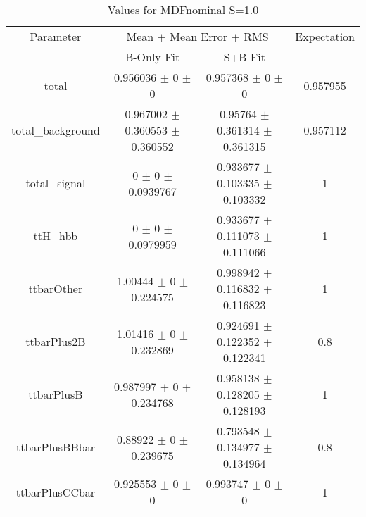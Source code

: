 \begin{table}
\centering
\caption{Values for MDFnominal S=1.0}
\begin{tabular}{cccc}
\toprule
Parameter & \multicolumn{2}{c}{Mean $\pm$ Mean Error $\pm$ RMS} & Expectation\\
 & B-Only Fit & S+B Fit & \\
\midrule
total & \num{0.956036} $\pm$ \num{0} $\pm$ \num{0} & \num{0.957368} $\pm$ \num{0} $\pm$ \num{0} & \num{0.957955}\\
total\_background & \num{0.967002} $\pm$ \num{0.360553} $\pm$ \num{0.360552} & \num{0.95764} $\pm$ \num{0.361314} $\pm$ \num{0.361315} & \num{0.957112}\\
total\_signal & \num{0} $\pm$ \num{0} $\pm$ \num{0.0939767} & \num{0.933677} $\pm$ \num{0.103335} $\pm$ \num{0.103332} & \num{1}\\
ttH\_hbb & \num{0} $\pm$ \num{0} $\pm$ \num{0.0979959} & \num{0.933677} $\pm$ \num{0.111073} $\pm$ \num{0.111066} & \num{1}\\
ttbarOther & \num{1.00444} $\pm$ \num{0} $\pm$ \num{0.224575} & \num{0.998942} $\pm$ \num{0.116832} $\pm$ \num{0.116823} & \num{1}\\
ttbarPlus2B & \num{1.01416} $\pm$ \num{0} $\pm$ \num{0.232869} & \num{0.924691} $\pm$ \num{0.122352} $\pm$ \num{0.122341} & \num{0.8}\\
ttbarPlusB & \num{0.987997} $\pm$ \num{0} $\pm$ \num{0.234768} & \num{0.958138} $\pm$ \num{0.128205} $\pm$ \num{0.128193} & \num{1}\\
ttbarPlusBBbar & \num{0.88922} $\pm$ \num{0} $\pm$ \num{0.239675} & \num{0.793548} $\pm$ \num{0.134977} $\pm$ \num{0.134964} & \num{0.8}\\
ttbarPlusCCbar & \num{0.925553} $\pm$ \num{0} $\pm$ \num{0} & \num{0.993747} $\pm$ \num{0} $\pm$ \num{0} & \num{1}\\
\bottomrule
\end{tabular}
\end{table}